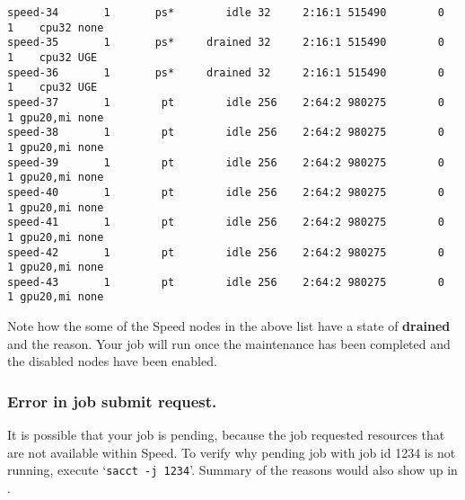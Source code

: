 \begin{verbatim}
speed-34       1       ps*        idle 32     2:16:1 515490        0      1    cpu32 none
speed-35       1       ps*     drained 32     2:16:1 515490        0      1    cpu32 UGE
speed-36       1       ps*     drained 32     2:16:1 515490        0      1    cpu32 UGE
speed-37       1        pt        idle 256    2:64:2 980275        0      1 gpu20,mi none
speed-38       1        pt        idle 256    2:64:2 980275        0      1 gpu20,mi none
speed-39       1        pt        idle 256    2:64:2 980275        0      1 gpu20,mi none
speed-40       1        pt        idle 256    2:64:2 980275        0      1 gpu20,mi none
speed-41       1        pt        idle 256    2:64:2 980275        0      1 gpu20,mi none
speed-42       1        pt        idle 256    2:64:2 980275        0      1 gpu20,mi none
speed-43       1        pt        idle 256    2:64:2 980275        0      1 gpu20,mi none
\end{verbatim}
\normalsize

Note how the some of the Speed nodes in the above list have a state of \textbf{drained}
and the reason.
Your job will run once the maintenance has been completed and the disabled nodes have been enabled.

\subsubsection{Error in job submit request.}

It is possible that your job is pending, because the job requested resources that are not available within Speed.
To verify why pending job with job id 1234 is not running, execute `\verb!sacct -j 1234!'.
Summary of the reasons would also show up in .
